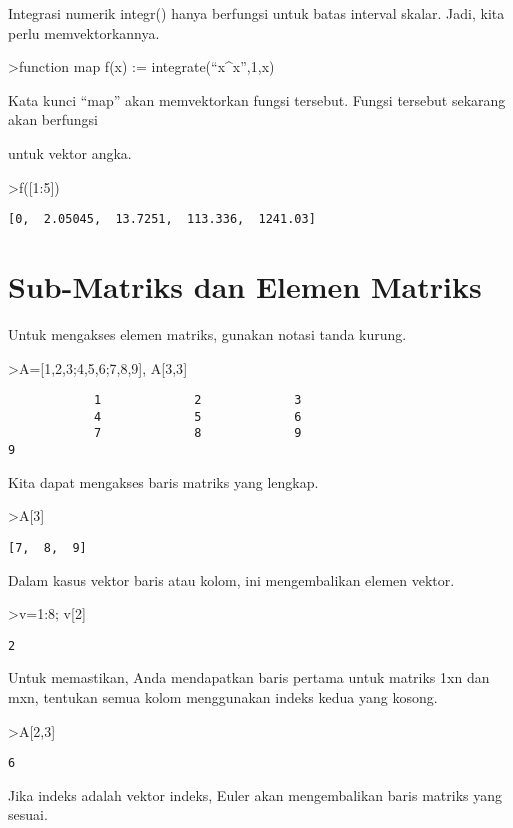 \documentclass[
]{book}
\begin{document}
Integrasi numerik integr() hanya berfungsi untuk batas interval skalar. Jadi, kita perlu memvektorkannya.

\textgreater function map f(x) := integrate(``x\^{}x'',1,x)

Kata kunci ``map'' akan memvektorkan fungsi tersebut. Fungsi tersebut sekarang akan berfungsi

untuk vektor angka.

\textgreater f({[}1:5{]})

\begin{verbatim}
[0,  2.05045,  13.7251,  113.336,  1241.03]
\end{verbatim}

\chapter{Sub-Matriks dan Elemen Matriks}\label{sub-matriks-dan-elemen-matriks}

Untuk mengakses elemen matriks, gunakan notasi tanda kurung.

\textgreater A={[}1,2,3;4,5,6;7,8,9{]}, A{[}3,3{]}

\begin{verbatim}
            1             2             3 
            4             5             6 
            7             8             9 
9
\end{verbatim}

Kita dapat mengakses baris matriks yang lengkap.

\textgreater A{[}3{]}

\begin{verbatim}
[7,  8,  9]
\end{verbatim}

Dalam kasus vektor baris atau kolom, ini mengembalikan elemen vektor.

\textgreater v=1:8; v{[}2{]}

\begin{verbatim}
2
\end{verbatim}

Untuk memastikan, Anda mendapatkan baris pertama untuk matriks 1xn dan mxn, tentukan semua kolom menggunakan indeks kedua yang kosong.

\textgreater A{[}2,3{]}

\begin{verbatim}
6
\end{verbatim}

Jika indeks adalah vektor indeks, Euler akan mengembalikan baris matriks yang sesuai.
\end{document}
